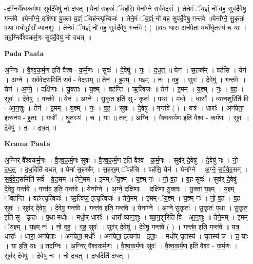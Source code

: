 \documentclass[17pt]{extarticle}
\begin{document}
-द॒ग्निर्वै᳚श्वकर्म॒णः सुव॑र्दे॒वेषु॑ नो दधत् ॥येना॑ स॒हस्रं॒ ॅवह॑सि॒ येना᳚ग्ने सर्ववेद॒सं । तेने॒मं ॅय॒ज्ञ्ं नो॑ वह॒ सुव॑र्दे॒वेषु॒ गन्त॑वे ॥येना᳚ग्ने॒ दक्षि॑णा यु॒क्ता य॒ज्ञ्ं ॅवह॑न्त्यृ॒त्विजः॑ । तेने॒मं ॅय॒ज्ञ्ं नो॑ वह॒ सुव॑र्दे॒वेषु॒ गन्त॑वे ॥येना᳚ग्ने॒ सु॒कृतः॑ प॒था मधो॒र्द्धारा᳚ व्यान॒शुः । तेने॒मं ॅय॒ज्ञ्ं नो॑ वह॒ सुव॑र्दे॒वेषु॒ गन्त॑वे ( ) ॥यत्र॒ धारा॒ अन॑पेता॒ मधो᳚र्घृ॒तस्य॑ च॒ याः । तद॒ग्निर्वै᳚श्वकर्म॒णः सुव॑र्दे॒वेषु॑ नो दधत् ॥ \newline

\textbf{Pada Paata} \newline

अ॒ग्निः । वै॒श्व॒क॒र्म॒ण इति॑ वैश्व - क॒र्म॒णः । सुवः॑ । दे॒वेषु॑ । नः॒ । द॒ध॒त् ॥ येन॑ । स॒हस्र᳚म् । वह॑सि । येन॑ । अ॒ग्ने॒ । स॒र्व॒वे॒द॒समिति॑ सर्व - वे॒द॒सम् ॥ तेन॑ । इ॒मम् । य॒ज्ञ्म् । नः॒ । व॒ह॒ । सुवः॑ । दे॒वेषु॑ । गन्त॑वे ॥ येन॑ । अ॒ग्ने॒ । दक्षि॑णाः । यु॒क्ताः । य॒ज्ञ्म् । वह॑न्ति । ऋ॒त्विजः॑ ॥ तेन॑ । इ॒मम् । य॒ज्ञ्म् । नः॒ । व॒ह॒ । सुवः॑ । दे॒वेषु॑ । गन्त॑वे ॥ येन॑ । अ॒ग्ने॒ । सु॒कृत॒ इति॑ सु - कृतः॑ । प॒था । मधोः᳚ । धाराः᳚ । व्या॒न॒शुरिति॑ वि - आ॒न॒शुः ॥ तेन॑ । इ॒मम् । य॒ज्ञ्म् । नः॒ । व॒ह॒ । सुवः॑ । दे॒वेषु॑ । गन्त॑वे ( ) ॥ यत्र॑ । धाराः᳚ । अन॑पेता॒ इत्यन॑प - इ॒ताः॒ । मधोः᳚ । घृ॒तस्य॑ । च॒ । याः ॥ तत् । अ॒ग्निः । वै॒श्व॒क॒र्म॒ण इति॑ वैश्व - क॒र्म॒णः । सुवः॑ । दे॒वेषु॑ । नः॒ । द॒ध॒त् ॥  \newline


\textbf{Krama Paata} \newline

अ॒ग्निर् वै᳚श्वकर्म॒णः । वै॒श्व॒क॒र्म॒णः सुवः॑ । वै॒श्व॒क॒र्म॒ण इति॑ वैश्व - क॒र्म॒णः । सुव॑र् दे॒वेषु॑ । दे॒वेषु॑ नः । नो॒ द॒ध॒त्॒ । द॒ध॒दिति॑ दधत् ॥ येना॑ स॒हस्र᳚म् । स॒हस्र॒म् ॅवह॑सि । वह॑सि॒ येन॑ । येना᳚ग्ने । अ॒ग्ने॒ स॒र्व॒वे॒द॒सम् । स॒र्व॒वे॒द॒समिति॑ सर्व - वे॒द॒सम् ॥ तेने॒मम् । इ॒मम् ॅय॒ज्ञ्म् । य॒ज्ञ्म् नः॑ । नो॒ व॒ह॒ । व॒ह॒ सुवः॑ । सुव॑र् दे॒वेषु॑ । दे॒वेषु॒ गन्त॑वे । गन्त॑व॒ इति॒ गन्त॑वे ॥ येना᳚ग्ने । अ॒ग्ने॒ दक्षि॑णाः । दक्षि॑णा यु॒क्ताः । यु॒क्ता य॒ज्ञ्म् । य॒ज्ञ्म् ॅवह॑न्ति । वह॑न्त्यृ॒त्विजः॑ । ऋ॒त्विज॒ इत्यृ॒त्विजः॑ ॥ तेने॒मम् । इ॒मम् ॅय॒ज्ञ्म् । य॒ज्ञ्म् नः॑ । नो॒ व॒ह॒ । व॒ह॒ सुवः॑ । सुव॑र् दे॒वेषु॑ । दे॒वेषु॒ गन्त॑वे । गन्त॑व॒ इति॒ गन्त॑वे ॥ येना᳚ग्ने । अ॒ग्ने॒ सु॒कृतः॑ । सु॒कृतः॑ प॒था । सु॒कृत॒ इति॑ सु - कृतः॑ । प॒था मधोः᳚ । मधो॒र् धाराः᳚ । धारा᳚ व्यान॒शुः । व्या॒न॒शुरिति॑ वि - आ॒न॒शुः ॥ तेने॒मम् । इ॒मम् ॅय॒ज्ञ्म् । य॒ज्ञ्म् नः॑ । नो॒ व॒ह॒ । व॒ह॒ सुवः॑ । सुव॑र् दे॒वेषु॑ । दे॒वेषु॒ गन्त॑वे ( ) । गन्त॑व॒ इति॒ गन्त॑वे ॥ यत्र॒ धाराः᳚ । धारा॒ अन॑पेताः । अन॑पेता॒ मधोः᳚ । अन॑पेता॒ इत्यन॑प - इ॒ताः॒ । मधो᳚र् घृ॒तस्य॑ । घृ॒तस्य॑ च । च॒ याः । या इति॒ याः ॥ तद॒ग्निः । अ॒ग्निर् वै᳚श्वकर्म॒णः । वै॒श्व॒क॒र्म॒णः सुवः॑ । वै॒श्व॒क॒र्म॒ण इति॑ वैश्व - क॒र्म॒णः । सुव॑र् दे॒वेषु॑ । दे॒वेषु॑ नः । नो॒ द॒ध॒त्॒ । द॒ध॒दिति॑ दधत् । \newline
\end{document}
